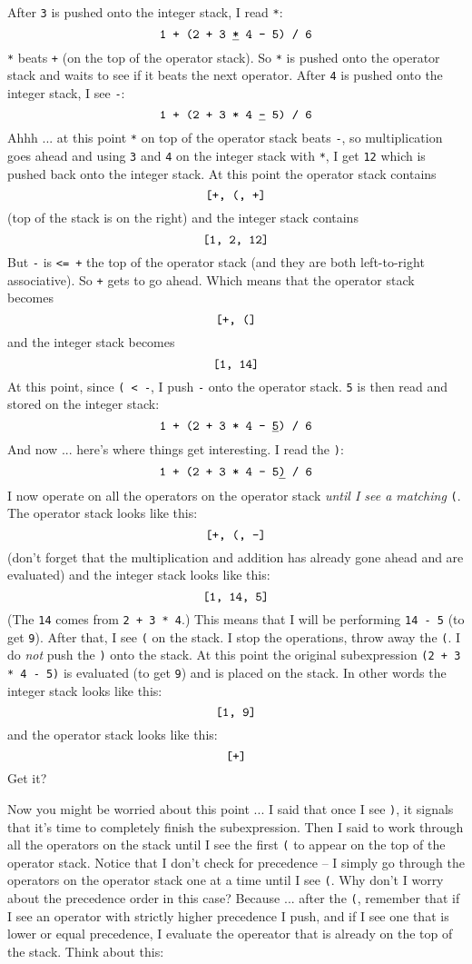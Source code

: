After \texttt{3} is pushed onto the integer stack, I read \texttt{*}:
\[
\text{\texttt{1 + (2 + 3 \underline{*} 4 - 5) / 6}}
\]
\texttt{*} beats \texttt{+} (on the top of the operator stack).
So \texttt{*} is pushed onto the operator stack and waits to
see if it beats the next operator.
After \texttt{4} is pushed onto the integer stack, I see \texttt{-}:
\[
\text{\texttt{1 + (2 + 3 * 4 \underline{-} 5) / 6}}
\]
Ahhh ... at this point \texttt{*} on top of the operator stack
beats \texttt{-}, so multiplication goes ahead and using \texttt{3}
and \texttt{4} on the integer stack with \texttt{*}, I get \texttt{12}
which is pushed back onto the integer stack.
At this point the operator stack contains
\[
\text{\texttt{[+, (, +]}}
\]
(top of the stack is on the right) and the integer stack contains
\[
\text{\texttt{[1, 2, 12]}}
\]
But \texttt{-} is \texttt{<= +} the top of the operator stack
(and they are both left-to-right associative).
So \texttt{+} gets to go ahead.
Which means that the operator stack becomes
\[
\text{\texttt{[+, (]}}
\]
and the integer stack becomes
\[
\text{\texttt{[1, 14]}}
\]
At this point, since \verb!( < -!, I push \verb!-! onto the
operator stack.
\texttt{5} is then read and stored on the integer stack:
\[
\text{\texttt{1 + (2 + 3 * 4 - \underline{5}) / 6}}
\]
And now ... here's where things get interesting.
I read the \texttt{)}:
\[
\text{\texttt{1 + (2 + 3 * 4 - 5\underline{)} / 6}}
\]
I now operate on all the operators on the operator stack
\textit{until I see a matching } \texttt{(}.
The operator stack looks like this:
\[
\text{\texttt{[+, (, -]}}
\]
(don't forget that the multiplication and addition has already gone ahead
and are evaluated)
and the integer stack looks like this:
\[
\text{\texttt{[1, 14, 5]}}
\]
(The \texttt{14} comes from \texttt{2 + 3 * 4}.)
This means that I will be performing \texttt{14 - 5} (to get \texttt{9}).
After that, I see \texttt{(} on the stack.
I stop the operations, throw away the \texttt{(}.
I do \textit{not} push the \texttt{)} onto the stack.
At this point the original subexpression \texttt{(2 + 3 * 4 - 5)}
is evaluated (to get \texttt{9}) and is placed on the stack.
In other words the integer stack looks like this:
\[
\text{\texttt{[1, 9]}}
\]
and the operator stack looks like this:
\[
\text{\texttt{[+]}}
\]
Get it?

Now you might be worried about this point ...
I said that once I see \texttt{)}, it signals that it's
time to completely finish the subexpression.
Then I said to work through all the operators on the stack
until I see the first \texttt{(} to appear on the top of the
operator stack.
Notice that I don't check for precedence --
I simply go through the operators on the operator
stack one at a time until I see \texttt{(}.
Why don't I worry about the precedence order in this case?
Because ... after the \texttt{(}, remember that
if I see an operator with strictly higher precedence I push,
and if I see one that is lower or equal precedence, I evaluate the opereator
that is already on the top of the stack.
Think about this:

